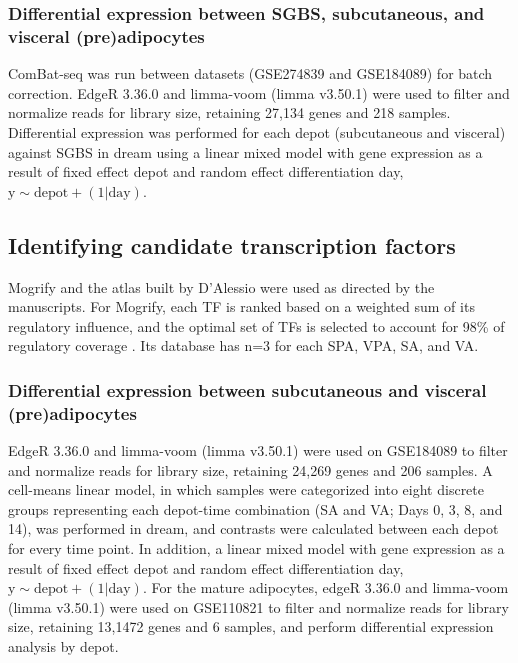 \subsubsection{Differential expression between SGBS, subcutaneous, and visceral (pre)adipocytes}
ComBat-seq was run between datasets (GSE274839 and GSE184089) for batch correction\cite{Zhang2020-kq}. EdgeR 3.36.0 and limma-voom (limma v3.50.1) were used to filter and normalize reads for library size\cite{Robinson2010-qx,Law2014-yh}, retaining 27,134 genes and 218 samples. Differential expression was performed for each depot (subcutaneous and visceral) against SGBS in dream\cite{Hoffman2021-xx} using a linear mixed model with gene expression as a result of fixed effect depot and random effect differentiation day, $\mathrm{y} \sim \mathrm{depot} + (1 | \mathrm{day})$.

\subsection{Identifying candidate transcription factors}
Mogrify and the atlas built by D'Alessio were used as directed by the manuscripts\cite{Rackham2016-ef,D-Alessio2015-ia}. For Mogrify, each TF is ranked based on a weighted sum of its regulatory influence, and the optimal set of TFs is selected to account for 98\% of regulatory coverage \cite{Rackham2016-ef}. Its database has n=3 for each SPA, VPA, SA, and VA.

\subsubsection{Differential expression between subcutaneous and visceral (pre)adipocytes}
EdgeR 3.36.0 and limma-voom (limma v3.50.1) were used on GSE184089 to filter and normalize reads for library size\cite{Robinson2010-qx,Law2014-yh}, retaining 24,269 genes and 206 samples. A cell-means linear model, in which samples were categorized into eight discrete groups representing each depot-time combination (SA and VA; Days 0, 3, 8, and 14), was performed in dream\cite{Hoffman2021-xx}, and contrasts were calculated between each depot for every time point. In addition, a linear mixed model with gene expression as a result of fixed effect depot and random effect differentiation day, $\mathrm{y} \sim \mathrm{depot} + (1 | \mathrm{day})$. For the mature adipocytes, edgeR 3.36.0 and limma-voom (limma v3.50.1) were used on GSE110821 to filter and normalize reads for library size, retaining 13,1472 genes and 6 samples, and perform differential expression analysis by depot\cite{Robinson2010-qx,Law2014-yh}.

